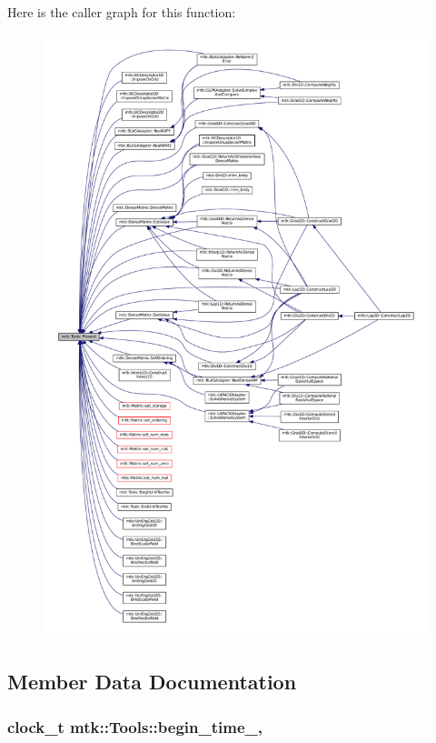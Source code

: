 Here is the caller graph for this function\+:
\nopagebreak
\begin{figure}[H]
\begin{center}
\leavevmode
\includegraphics[width=350pt]{classmtk_1_1Tools_afe5bb096309258e2e72503fd7b41c7e0_icgraph}
\end{center}
\end{figure}




\subsection{Member Data Documentation}
\hypertarget{classmtk_1_1Tools_a4bd58d08397db42271ed9e2d3ecc9963}{
\subsubsection[{begin\+\_\+time\+\_\+}]{\setlength{\rightskip}{0pt plus 5cm}clock\+\_\+t mtk\+::\+Tools\+::begin\+\_\+time\+\_\+\hspace{0.3cm}{\ttfamily [static]}, {\ttfamily [private]}}}\label{classmtk_1_1Tools_a4bd58d08397db42271ed9e2d3ecc9963}


